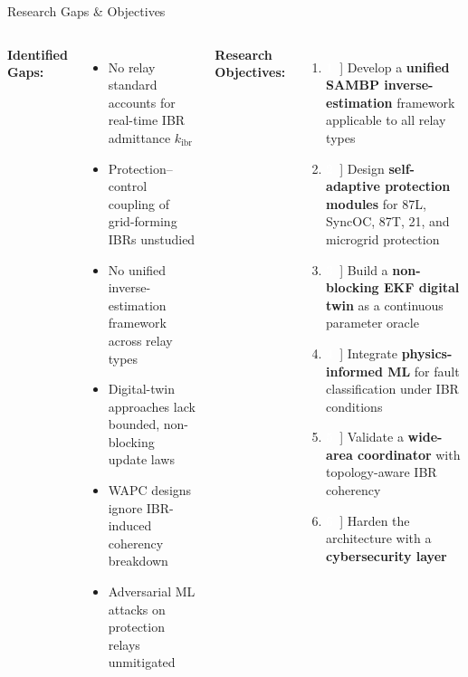 \documentclass[10pt,aspectratio=169]{beamer}
\newcommand{\bitem}[1]{%
  \makebox[16pt]{\textcolor{white}{\colorbox{iitmblue}{\bfseries\scriptsize#1}}}\,%
}
\newcommand{\kibr}{k_{\mathrm{ibr}}}
\begin{document}
\begin{frame}{Research Gaps \& Objectives}
  \begin{columns}[T]
      \textbf{\color{iitmred}Identified Gaps:}
      \medskip
      \begin{itemize}\itemsep4pt
        \item No relay standard accounts for real-time IBR admittance $\kibr$
        \item Protection–control coupling of grid-forming IBRs unstudied
        \item No unified inverse-estimation framework across relay types
        \item Digital-twin approaches lack bounded, non-blocking update laws
        \item WAPC designs ignore IBR-induced coherency breakdown
        \item Adversarial ML attacks on protection relays unmitigated
      \end{itemize}
      \textbf{\color{iitmnavy}Research Objectives:}
      \medskip
      \begin{enumerate}\itemsep3pt
        \item[\bitem{1}] Develop a \textbf{unified SAMBP inverse-estimation}
          framework applicable to all relay types
        \item[\bitem{2}] Design \textbf{self-adaptive protection modules}
          for 87L, SyncOC, 87T, 21, and microgrid protection
        \item[\bitem{3}] Build a \textbf{non-blocking EKF digital twin}
          as a continuous parameter oracle
        \item[\bitem{4}] Integrate \textbf{physics-informed ML} for fault
          classification under IBR conditions
        \item[\bitem{5}] Validate a \textbf{wide-area coordinator} with
          topology-aware IBR coherency
        \item[\bitem{6}] Harden the architecture with a
          \textbf{cybersecurity layer}
      \end{enumerate}
  \end{columns}
\end{frame}
\end{document}
